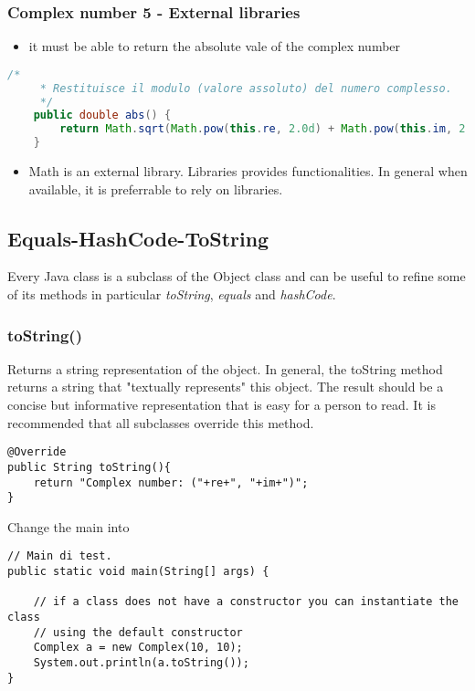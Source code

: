 \documentclass{article}
\begin{document}
\subsubsection{Complex number 5 - External libraries}
\begin{itemize}
\item it must be able to return the absolute vale of the complex number 
\end{itemize}

\begin{lstlisting}[language=Java,escapechar=|]
/*
	 * Restituisce il modulo (valore assoluto) del numero complesso.
	 */
	public double abs() {
		return Math.sqrt(Math.pow(this.re, 2.0d) + Math.pow(this.im, 2.0d));
	}
\end{lstlisting}

\begin{itemize}
\item Math is an external library. Libraries provides functionalities. In general when available, it is preferrable to rely on libraries. 
\end{itemize}



\subsection{Equals-HashCode-ToString}
Every Java class is a subclass of the Object class and can be useful to refine some of its methods in particular \emph{toString}, \emph{equals} and \emph{hashCode}.

\subsubsection{toString()}
Returns a string representation of the object. In general, the toString method returns a string that "textually represents" this object. The result should be a concise but informative representation that is easy for a person to read. It is recommended that all subclasses override this method.
\begin{lstlisting}
@Override
public String toString(){
    return "Complex number: ("+re+", "+im+")";
}
\end{lstlisting}
Change the main into
\begin{lstlisting}
// Main di test.
public static void main(String[] args) {

	// if a class does not have a constructor you can instantiate the class
	// using the default constructor
	Complex a = new Complex(10, 10);
	System.out.println(a.toString());
}
\end{lstlisting}
\end{document}
